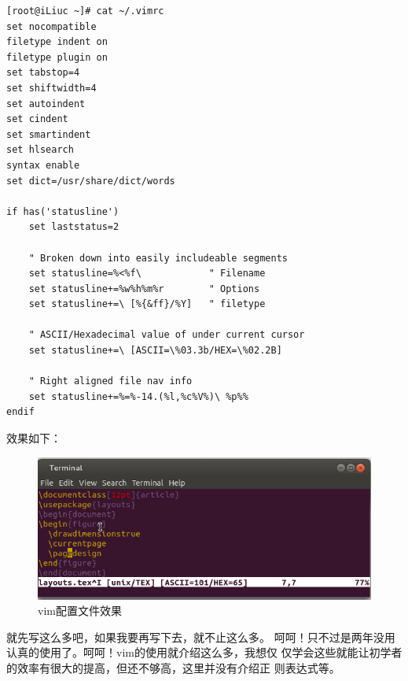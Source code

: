 \begin{verbatim}
[root@iLiuc ~]# cat ~/.vimrc
set nocompatible
filetype indent on
filetype plugin on
set tabstop=4
set shiftwidth=4
set autoindent
set cindent
set smartindent
set hlsearch
syntax enable
set dict=/usr/share/dict/words

if has('statusline')
    set laststatus=2

    " Broken down into easily includeable segments
    set statusline=%<%f\            " Filename
    set statusline+=%w%h%m%r        " Options
    set statusline+=\ [%{&ff}/%Y]   " filetype

    " ASCII/Hexadecimal value of under current cursor
    set statusline+=\ [ASCII=\%03.3b/HEX=\%02.2B]

    " Right aligned file nav info
    set statusline+=%=%-14.(%l,%c%V%)\ %p%%
endif
\end{verbatim}

效果如下：

\begin{figure}[htbp]
  \centering
  \includegraphics[width=.75\textwidth]{img/vimrc.png}
  \caption{vim配置文件效果}
  \label{fig:vimConf}
\end{figure}

就先写这么多吧，如果我要再写下去，就不止这么多。
呵呵！只不过是两年没用认真的使用了。呵呵！vim的使用就介绍这么多，我想仅
仅学会这些就能让初学者的效率有很大的提高，但还不够高，这里并没有介绍正
则表达式等。
